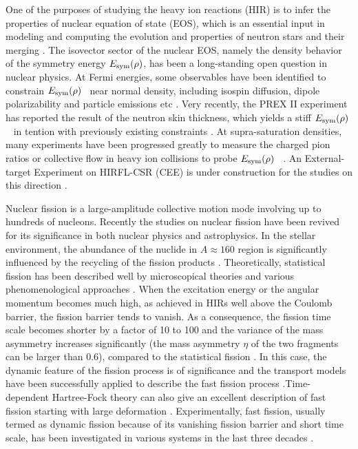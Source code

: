 \documentclass[submitting]{nst}
\def\esym{$E_{sym}(\rho)$}
\def\esym {$E_{\rm sym}(\rho)$}
\begin{document}
One of the purposes of studying the heavy ion reactions (HIR) is to infer the properties of nuclear equation of state (EOS), which is an essential input in modeling and computing the evolution and properties of neutron stars and their merging \cite{Liba2021,Ligo2017,Ligo2018}.  The isovector sector of the nuclear EOS, namely the density behavior of the symmetry energy \esym, has been a long-standing  open question in nuclear physics. At Fermi energies,  some observables have been identified to constrain \esym~ near normal density, including isospin diffusion,  dipole polarizability and particle emissions  etc \cite{Tsang2004,Chenlw2005,Tsang2001,Chenlw2010,Zz2014,Tsang2009,Zy2017}.
 Very recently, the PREX II experiment has reported the result of the neutron skin thickness, which yields a stiff \esym~ in tention with previously existing  constraints \cite{Prex2,Reed2021}.  At supra-saturation densities, many experiments  have been progressed greatly to measure the charged pion ratios or collective flow in heavy ion collisions to probe \esym~ \cite{Sprit2021,Yongjia2020}. An External-target Experiment on  HIRFL-CSR (CEE) is under construction for the studies on this direction  \cite{LLM2017,LLM2020}.   


Nuclear fission is a large-amplitude collective motion mode involving up to hundreds of nucleons. Recently the studies on nuclear fission have been revived for its significance in both nuclear physics and astrophysics. In the stellar environment, the abundance of the nuclide in $A\approx 160$ region is significantly influenced by the recycling of the fission products \cite{Lorusso2015,Nishimura2012,Suzuki2012}. Theoretically, statistical fission has been described well by microscopical theories and various phenomenological approaches \cite{PBR96,SCH99,JB2007,LB2011,Zhanghf2014,Tanimura2017,TZL17,WY2018,WY2018-2,Pomorski2021, Pavel2021,Zhengh2018,Guol2018}. When the excitation energy or the angular momentum becomes much high, as achieved in HIRs well above the Coulomb barrier, the fission barrier tends to vanish. As a consequence,  the fission time scale becomes shorter by a factor of 10 to 100 and the variance of the mass asymmetry increases significantly (the mass asymmetry $\eta$ of the two fragments can be larger than 0.6), compared to the statistical fission \cite{Greg82, Greg82t, Gla83, Leray84, Zheng84}. In this case, the dynamic feature of the fission process is of significance and the transport models have been successfully applied to describe the fast fission process \cite{Wen13, Russ11,Riz11,TL09,TO11,LTQ13,TW08,LTO13,WT11}.Time-dependent Hartree-Fock theory can also give an excellent description of fast fission starting with large deformation \cite{God2015}.  Experimentally, fast fission, usually termed as dynamic fission because of its vanishing fission barrier and short time scale, has  been investigated in various systems in the last three decades \cite{Bocage2000,Filippo2005,Filippo2012,Pagano2018,Piantelli2020,WRS2014,Casini1993}.
\end{document}

